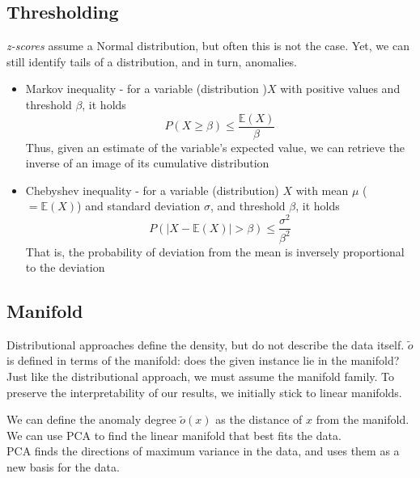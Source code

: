 \subsection{Thresholding}

\textit{z-scores} assume a Normal distribution, but often this is not the case. Yet, we can still
identify tails of a distribution, and in turn, anomalies.

\begin{itemize}
   \item Markov inequality - for a variable (distribution )$X$ with positive values and threshold $\beta$, it holds
   \[
      P(X \geq \beta) \leq \frac{\mathbb{E}(X)}{\beta}
   \]
   Thus, given an estimate of the variable's expected value, we can retrieve the inverse of an image of its cumulative distribution
   \item Chebyshev inequality - for a variable (distribution) $X$ with mean $\mu$ ($=\mathbb{E}(X)$) and standard deviation $\sigma$, and threshold $\beta$, it holds
   \[
   P(|X - \mathbb{E}(X)| > \beta) \leq \frac{\sigma^2}{\beta^2}
   \]
   That is, the probability of deviation from the mean is inversely proportional to the deviation
\end{itemize}

\subsection{Manifold}

Distributional approaches define the density, but do not describe the data itself. $\tilde{o}$ is defined in terms of the manifold: does the given instance lie in the manifold? Just like
the distributional approach, we must assume the manifold family.
To preserve the interpretability of our results, we initially stick to linear manifolds.

We can define the anomaly degree $\tilde{o}(x)$ as the distance of $x$ from the manifold.\\
We can use PCA to find the linear manifold that best fits the data.\\
PCA finds the directions of maximum variance in the data, and uses them as a new basis for the data.

